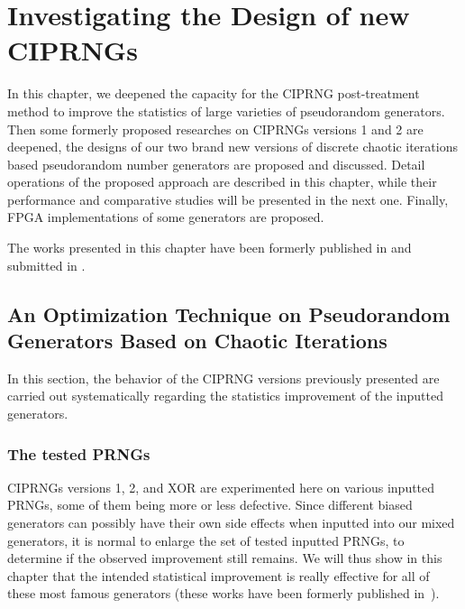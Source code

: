 \chapter{Investigating the Design of new CIPRNGs}
\label{CI dev}
\minitoc

In this chapter, we deepened the capacity for the CIPRNG post-treatment method 
to improve the statistics of large varieties of pseudorandom generators. Then some formerly proposed researches on CIPRNGs versions 1 and 2 are deepened, the designs of our two brand new versions of discrete chaotic iterations based pseudorandom number generators are proposed and discussed. Detail operations of the proposed approach are described in this chapter, while their performance and  comparative studies will be presented in the next one. Finally, FPGA implementations of
some generators are proposed. 

The works presented in this chapter have been formerly published in \cite{submit2,bfg12a:ip} and submitted in \cite{submit1, submit3}.

\section{An Optimization Technique on Pseudorandom Generators Based on Chaotic Iterations}
In this section, the behavior of the CIPRNG versions previously presented 
are carried out systematically regarding 
the statistics improvement of the inputted generators.

\subsection{The tested PRNGs}

CIPRNGs versions 1, 2, and XOR are experimented here on various inputted PRNGs,
some of them being more or less defective.
Since different biased generators can possibly have their own side effects when inputted into our mixed generators, it is normal to enlarge the set of tested inputted PRNGs, to determine if the observed improvement still remains.
We will thus show in this chapter that the intended statistical improvement is really effective for all of these most famous generators (these works have been
formerly published in~\cite{bfg12a:ip}).

